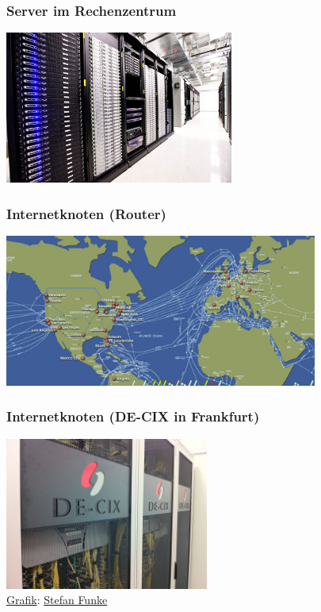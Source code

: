 \begin{frame}
    \frametitle{Server im Rechenzentrum}
    \begin{center}
      \includegraphics[height=5cm]{../../img/data_center.jpg}
    \end{center}
\end{frame}


\begin{frame}
    \frametitle{Internetknoten (Router)}
    \begin{center}
      \includegraphics[height=5cm]{../../img/internet_cable_map.png}
    \end{center}
\end{frame}

\begin{frame}
    \frametitle{Internetknoten (DE-CIX in Frankfurt)}
    \begin{center}
      \includegraphics[height=5cm]{../../img/de_cix.jpg}
      \\{\small \href{https://de.wikipedia.org/wiki/DE-CIX\#/media/File:DE-CIX\_GERMANY\_-\_Switch\_Rack\_\%286218137120\%29.jpg}{Grafik}: \href{https://creativecommons.org/licenses/by-sa/2.0/}{ Stefan Funke}}
    \end{center}
\end{frame}
